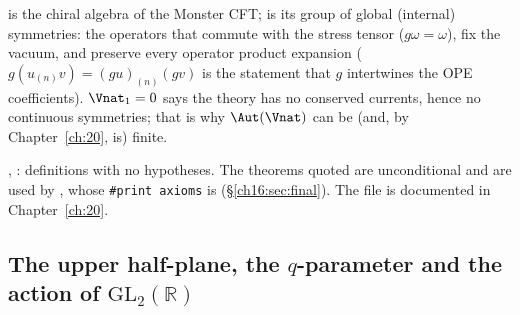 \begin{physics}
 is the chiral algebra of the Monster CFT;  is its group of global (internal) symmetries:
the operators that commute with the stress tensor ($g\omega=\omega$), fix the vacuum, and preserve every operator
product expansion ($g(u_{(n)}v)=(gu)_{(n)}(gv)$ is the statement that $g$ intertwines the OPE coefficients).
$\Vnat_1=0$ says the theory has no conserved currents, hence no continuous symmetries; that is why $\Aut(\Vnat)$ can
be (and, by Chapter~\ref{ch:20}, is) finite.
\end{physics}
\begin{status}
, : definitions with no hypotheses.  The theorems quoted are unconditional and are used by
, whose \texttt{\#print axioms} is 
(\S\ref{ch16:sec:final}).  The file  is documented in Chapter~\ref{ch:20}.
\end{status}

\subsection{The upper half-plane, the \texorpdfstring{$q$}{q}-parameter and the action of \texorpdfstring{$\mathrm{GL}_2(\mathbb{R})$}{GL2(R)}}\label{ch16:sec:analytic}

